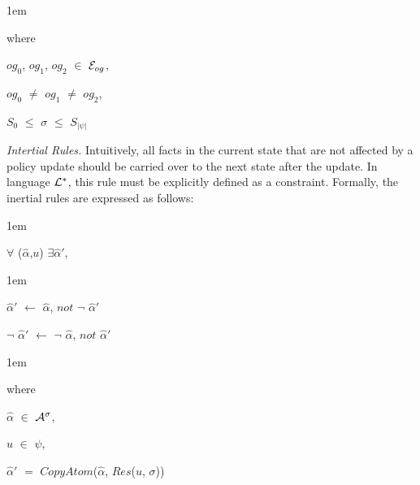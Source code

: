\documentclass[11pt]{report}
\newenvironment{vquote}
{
  \begin{list}{}{\leftmargin 1em}\item[]
}
{
  \end{list}
}
\begin{document}
\begin{enumerate}
\begin{enumerate}
                  \begin{vquote}
                    where

                    \hspace{1em}
                    $og_{0}$, $og_{1}$, $og_{2}$ $\in$ ${\cal E}_{og}$,

                    \hspace{1em}
                    $og_{0}$ $\neq$ $og_{1}$ $\neq$ $og_{2}$,

                    \hspace{1em}
                    $S_{0}$ $\leq$ $\sigma$ $\leq$ $S_{|\psi|}$
                  \end{vquote}
              \end{enumerate}

            \item
              {\em Intertial Rules.}
              Intuitively, all facts in the current state that are not
              affected by a policy update should be carried over to the
              next state after the update. In language ${\cal L}^{*}$,
              this rule must be explicitly defined as a constraint. Formally,
              the inertial rules are expressed as follows:

              \begin{vquote}
                $\forall$ ($\hat{\alpha}$,$u$) $\exists$$\hat{\alpha}'$,
              \end{vquote}

              \begin{vquote}
                $\hat{\alpha}'$ $\leftarrow$
                  $\hat{\alpha}$, $not$ $\lnot$ $\hat{\alpha}'$

                $\lnot$ $\hat{\alpha}'$ $\leftarrow$
                  $\lnot$ $\hat{\alpha}$, $not$ $\hat{\alpha}'$
              \end{vquote}

              \begin{vquote}
                where

                \hspace{1em}
                $\hat{\alpha}$ $\in$ ${\cal A}^{\sigma}$,

                \hspace{1em}
                $u$ $\in$ $\psi$,

                \hspace{1em}
                $\hat{\alpha}'$ $=$
                $CopyAtom$($\hat{\alpha}$, $Res$($u$, $\sigma$))
              \end{vquote}


\end{enumerate}
\end{document}
